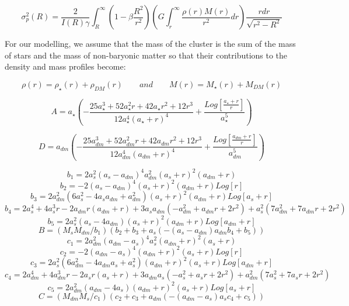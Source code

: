 \begin{equation}
\sigma_{p}^{2}(R)=\frac{2}{I(R)\gamma}\int_{R}^{\infty}\left(1-\beta\frac{R^{2}}{r^{2}}\right)\left(G\int_{r}^{\infty}\frac{\rho(r)M(r)}{r^{2}}dr\right)\frac{rdr}{\sqrt{r^{2}-R^{2}}}
\end{equation}

For our modelling, we assume that the mass of the cluster is the sum of the mass of stars and the mass of non-baryonic matter so that their contributions to the density and mass profiles become:

\begin{equation}
\rho(r)=\rho_{\star}(r)+\rho_{DM}(r)\qquad and \qquad M(r)=M_{\star}(r)+M_{DM}(r)
\end{equation} 

\begin{equation}
A=a_{\star}\left(-\frac{25a_{\star}^{3}+52a_{\star}^{2}r+42a_{\star}r^{2}+12r^{3}}{12a_{\star}^{4}\left(a_{\star}+r\right)^{4}}+\frac{Log\left[\frac{a_{\star}+r}{r}\right]}{a_{\star}^{5}}\right)
\end{equation}

\begin{equation}
D=a_{dm}\left(-\frac{25a_{dm}^{3}+52a_{dm}^{2}r+42a_{dm}r^{2}+12r^{3}}{12a_{dm}^{4}\left(a_{dm}+r\right)^{4}}+\frac{Log\left[\frac{a_{dm}+r}{r}\right]}{a_{dm}^{5}}\right)
\end{equation}

\[
b_{1}=2a_{s}^{2}(a_{s}-a_{dm})^{4}a_{dm}^{2}(a_{s}+r)^{2}(a_{dm}+r)
\]
\[
b_{2}=-2\left(a_{s}-a_{dm}\right)^{4}\left(a_{s}+r\right)^{2}\left(a_{dm}+r\right)Log[r]
\]
\[
b_{3}=2a_{dm}^{2}\left(6a_{s}^{2}-4a_{s}a_{dm}+a_{dm}^{2}\right)\left(a_{s}+r\right)^{2}\left(a_{dm}+r\right)Log[a_{s}+r]
\]
\[
b_{4}=2a_{s}^{4}+4a_{s}^{3}r-2a_{dm}r(a_{dm}+r)+3a_{s}a_{dm}\left(-a_{dm}^{2}+a_{dm}r+2r^{2}\right)+a_{s}^{2}\left(7a_{dm}^{2}+7a_{dm}r+2r^{2}\right)
\]
\[
b_{5}=2a_{s}^{2}\left(a_{s}-4a_{dm}\right)\left(a_{s}+r\right)^{2}\left(a_{dm}+r\right)Log[a_{dm}+r]
\]
\[
B=\left(M_{s}M_{dm}/b_{1}\right)\left(b_{2}+b_{3}+a_{s}\left(-\left(a_{s}-a_{dm}\right)a_{dm}b_{4}+b_{5}\right)\right)
\]
\[
c_{1}=2a_{dm}^{2}(a_{dm}-a_{s})^{4}a_{s}^{2}(a_{dm}+r)^{2}(a_{s}+r)
\]
\[
c_{2}=-2\left(a_{dm}-a_{s}\right)^{4}\left(a_{dm}+r\right)^{2}\left(a_{s}+r\right)Log[r]
\]
\[
c_{3}=2a_{s}^{2}\left(6a_{dm}^{2}-4a_{dm}a_{s}+a_{s}^{2}\right)\left(a_{dm}+r\right)^{2}\left(a_{s}+r\right)Log[a_{dm}+r]
\]
\[
c_{4}=2a_{dm}^{4}+4a_{dm}^{3}r-2a_{s}r(a_{s}+r)+3a_{dm}a_{s}\left(-a_{s}^{2}+a_{s}r+2r^{2}\right)+a_{dm}^{2}\left(7a_{s}^{2}+7a_{s}r+2r^{2}\right)
\]
\[
c_{5}=2a_{dm}^{2}\left(a_{dm}-4a_{s}\right)\left(a_{dm}+r\right)^{2}\left(a_{s}+r\right)Log[a_{s}+r]
\]
\[
C=\left(M_{dm}M_{s}/c_{1}\right)\left(c_{2}+c_{3}+a_{dm}\left(-\left(a_{dm}-a_{s}\right)a_{s}c_{4}+c_{5}\right)\right)
\]



